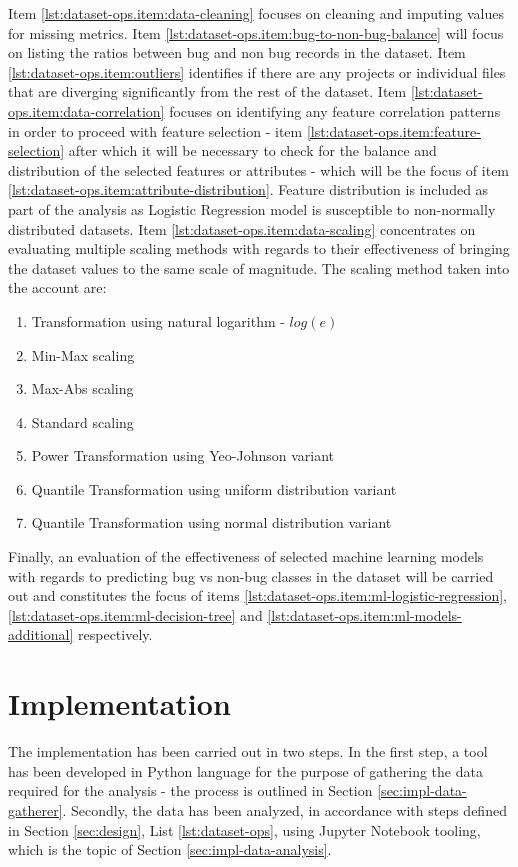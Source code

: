 Item \ref{lst:dataset-ops.item:data-cleaning} focuses on cleaning and imputing values for missing metrics. Item \ref{lst:dataset-ops.item:bug-to-non-bug-balance} will focus on listing the ratios between bug and non bug records in the dataset.
Item \ref{lst:dataset-ops.item:outliers} identifies if there are any projects or individual files that are diverging significantly from the rest of the dataset. 
Item \ref{lst:dataset-ops.item:data-correlation} focuses on identifying any feature correlation patterns in order to proceed with feature selection - item  \ref{lst:dataset-ops.item:feature-selection} after which it will be necessary to check for the balance and distribution of the selected features or attributes - which will be the focus of item \ref{lst:dataset-ops.item:attribute-distribution}. Feature distribution is included as part of the analysis as Logistic Regression model is susceptible to non-normally distributed datasets.
Item \ref{lst:dataset-ops.item:data-scaling} concentrates on evaluating multiple scaling methods with regards to their effectiveness of bringing the dataset values to the same scale of magnitude. The scaling method taken into the account are:
\begin{enumerate}
    \item Transformation using natural logarithm - $log(e)$ 
    \item Min-Max scaling
    \item Max-Abs scaling
    \item Standard scaling
    \item Power Transformation using Yeo-Johnson variant
    \item Quantile Transformation using uniform distribution variant
    \item Quantile Transformation using normal distribution variant
\end{enumerate}

Finally, an evaluation of the effectiveness of selected machine learning models with regards to predicting bug vs non-bug classes in the dataset will be carried out and constitutes the focus of items \ref{lst:dataset-ops.item:ml-logistic-regression}, \ref{lst:dataset-ops.item:ml-decision-tree} and \ref{lst:dataset-ops.item:ml-models-additional} respectively.

\section{Implementation}\label{sec:implementation}
The implementation has been carried out in two steps. In the first step, a tool has been developed in Python language for the purpose of gathering the data required for the analysis - the process is outlined in Section \ref{sec:impl-data-gatherer}. Secondly, the data has been analyzed, in accordance with steps defined in Section \ref{sec:design}, List \ref{lst:dataset-ops}, using Jupyter Notebook tooling, which is the topic of Section \ref{sec:impl-data-analysis}.

